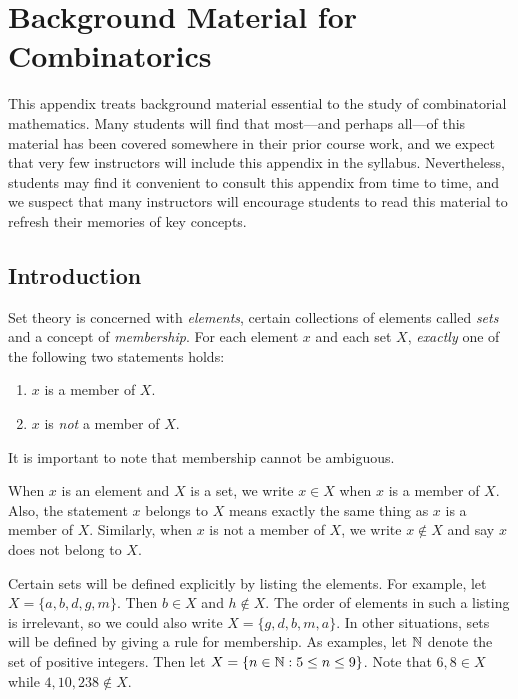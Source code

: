 
\chapter{Background Material for Combinatorics}\label{app:background}

This appendix treats background material essential to the
study of combinatorial mathematics.  Many students will find that
most---and perhaps all---of this material has been covered somewhere
in their prior course work, and we expect that very few instructors
will include this appendix in the syllabus.  Nevertheless, students
may find it convenient to consult this appendix from time to
time, and we suspect that many instructors will encourage
students to read this material to refresh their memories of key
concepts.  

\section{Introduction}

Set theory is concerned with \textit{elements}, certain collections
of elements called \textit{sets} and a concept of \textit{membership}.
For each element $x$ and each set $X$, \textit{exactly} one of the 
following two statements holds:

\begin{enumerate}
\item $x$ is a member of $X$. 
\item $x$ is \textit{not} a member of $X$. 
\end{enumerate}

It is important to note that membership cannot be ambiguous.

When $x$ is an element and $X$ is a set, we write $x\in X$ when
$x$ is a member of $X$.  Also, the statement $x$ belongs to $X$ means
exactly the same thing as $x$ is a member of $X$.  Similarly, when
$x$ is not a member of $X$, we write $x\notin X$ and say $x$ does
not belong to $X$.

Certain sets will be defined explicitly by listing the elements.
For example, let $X=\{a,b,d,g,m\}$.  Then $b\in X$ and $h\notin X$.
The order of elements in such a listing is irrelevant, so we could
also write $X=\{g,d,b,m,a\}$.  In other situations, sets will be 
defined by giving a rule for membership.
As examples, let $\mathbb{N}$ denote the set of positive integers.  
Then let $X=\{n\in\mathbb{N}:5\le n\le 9\}$.   Note that $6,8\in X$ while
$4,10,238\notin X$.

